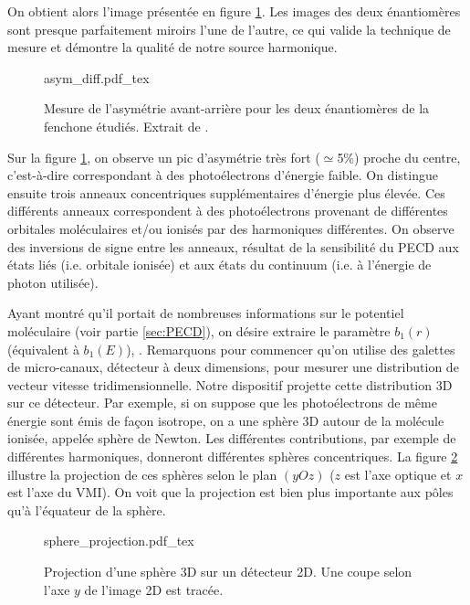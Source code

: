 On obtient alors l'image présentée en figure \ref{fig:asym_diff}. Les images des deux énantiomères sont presque parfaitement miroirs l'une de l'autre, ce qui valide la technique de mesure et démontre la qualité de notre source harmonique. 

\begin{figure}[!ht]
\centering
\def\svgwidth{0.8\columnwidth}
{asym_diff.pdf_tex}
\caption{Mesure de l'asymétrie avant-arrière pour les deux énantiomères de la fenchone étudiés. Extrait de .}
\label{fig:asym_diff}
\end{figure}

Sur la figure \ref{fig:asym_diff}, on observe un pic d'asymétrie très fort ($\simeq$5\%) proche du centre, c'est-à-dire correspondant à des photoélectrons d'énergie faible. On distingue ensuite trois anneaux concentriques supplémentaires d'énergie plus élevée. Ces différents anneaux correspondent à des photoélectrons provenant de différentes orbitales moléculaires et/ou ionisés par des harmoniques différentes. On observe des inversions de signe entre les anneaux, résultat de la sensibilité du PECD aux états liés (i.e. orbitale ionisée) et aux états du continuum (i.e. à l'énergie de photon utilisée). 

Ayant montré qu'il portait de nombreuses informations sur le potentiel moléculaire (voir partie \ref{sec:PECD}), on désire extraire le paramètre $b_1(r)$ (équivalent à $b_1(E)$), . Remarquons pour commencer qu'on utilise des galettes de micro-canaux, détecteur à deux dimensions, pour mesurer une distribution de vecteur vitesse tridimensionnelle. Notre dispositif projette cette distribution 3D sur ce détecteur. Par exemple, si on suppose que les photoélectrons de même énergie sont émis de façon isotrope, on a une sphère 3D autour de la molécule ionisée, appelée sphère de Newton. Les différentes contributions, par exemple de différentes harmoniques, donneront différentes sphères concentriques. La figure \ref{fig:sphere_projection} illustre la projection de ces sphères selon le plan $(yOz)$ ($z$ est l'axe optique et $x$ est l'axe du VMI). On voit que la projection est bien plus importante aux pôles qu'à l'équateur de la sphère. 

\begin{figure}[!ht]
\centering
\def\svgwidth{0.5\columnwidth}
{sphere_projection.pdf_tex}
\caption{Projection d'une sphère 3D sur un détecteur 2D. Une coupe selon l'axe $y$ de l'image 2D est tracée.}
\label{fig:sphere_projection}
\end{figure}


